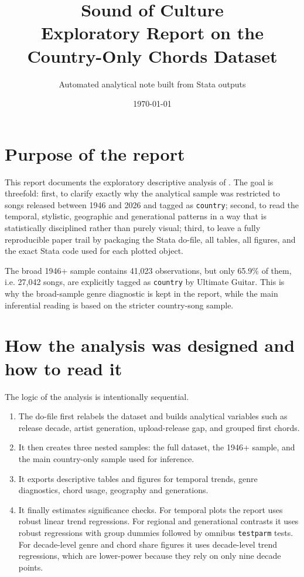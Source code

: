 \documentclass[11pt]{article}
\title{Sound of Culture\\Exploratory Report on the Country-Only Chords Dataset}
\author{Automated analytical note built from Stata outputs}
\date{\today}
\begin{document}
\maketitle
\tableofcontents
\clearpage

\section{Purpose of the report}
This report documents the exploratory descriptive analysis of
.
The goal is threefold: first, to clarify exactly why the analytical sample was
restricted to songs released between 1946 and 2026 and tagged as \texttt{country};
second, to read the temporal, stylistic, geographic and generational patterns in a
way that is statistically disciplined rather than purely visual; third, to leave a
fully reproducible paper trail by packaging the Stata do-file, all tables, all
figures, and the exact Stata code used for each plotted object.

The broad 1946+ sample contains 41,023 observations, but only
65.9\% of them, i.e. 27,042 songs, are
explicitly tagged as \texttt{country} by Ultimate Guitar. This is why the broad-sample
genre diagnostic is kept in the report, while the main inferential reading is based on
the stricter country-song sample.

\section{How the analysis was designed and how to read it}
The logic of the analysis is intentionally sequential.

\begin{enumerate}
\item The do-file first relabels the dataset and builds analytical variables such as release decade, artist generation, upload-release gap, and grouped first chords.
\item It then creates three nested samples: the full dataset, the 1946+ sample, and the main country-only sample used for inference.
\item It exports descriptive tables and figures for temporal trends, genre diagnostics, chord usage, geography and generations.
\item It finally estimates significance checks. For temporal plots the report uses robust linear trend regressions. For regional and generational contrasts it uses robust regressions with group dummies followed by omnibus \texttt{testparm} tests. For decade-level genre and chord share figures it uses decade-level trend regressions, which are lower-power because they rely on only nine decade points.
\end{enumerate}
\end{document}
